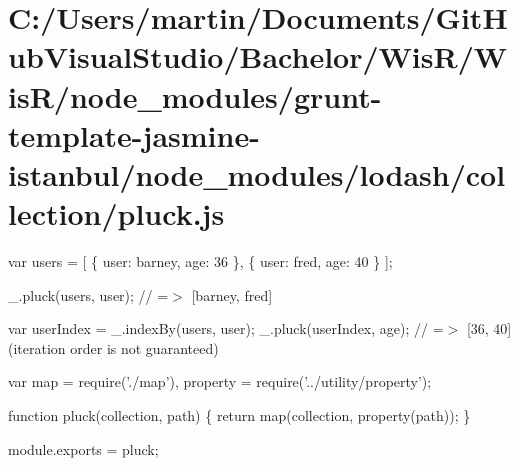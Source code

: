 \hypertarget{_c_1_2_users_2martin_2_documents_2_git_hub_visual_studio_2_bachelor_2_wis_r_2_wis_r_2node_module04d2c6aa97c6c0df05a78f7cbc9841af}{}\section{C\+:/\+Users/martin/\+Documents/\+Git\+Hub\+Visual\+Studio/\+Bachelor/\+Wis\+R/\+Wis\+R/node\+\_\+modules/grunt-\/template-\/jasmine-\/istanbul/node\+\_\+modules/lodash/collection/pluck.\+js}
var users = \mbox{[} \{ \textquotesingle{}user\textquotesingle{}\+: \textquotesingle{}barney\textquotesingle{}, \textquotesingle{}age\textquotesingle{}\+: 36 \}, \{ \textquotesingle{}user\textquotesingle{}\+: \textquotesingle{}fred\textquotesingle{}, \textquotesingle{}age\textquotesingle{}\+: 40 \} \mbox{]};

\+\_\+.\+pluck(users, \textquotesingle{}user\textquotesingle{}); // =$>$ \mbox{[}\textquotesingle{}barney\textquotesingle{}, \textquotesingle{}fred\textquotesingle{}\mbox{]}

var user\+Index = \+\_\+.\+index\+By(users, \textquotesingle{}user\textquotesingle{}); \+\_\+.\+pluck(user\+Index, \textquotesingle{}age\textquotesingle{}); // =$>$ \mbox{[}36, 40\mbox{]} (iteration order is not guaranteed)


\begin{DoxyCodeInclude}
var map = require(\textcolor{stringliteral}{'./map'}),
    \textcolor{keyword}{property} = require(\textcolor{stringliteral}{'../utility/property'});

\textcolor{keyword}{function} pluck(collection, path) \{
  \textcolor{keywordflow}{return} map(collection, property(path));
\}

module.exports = pluck;
\end{DoxyCodeInclude}
 